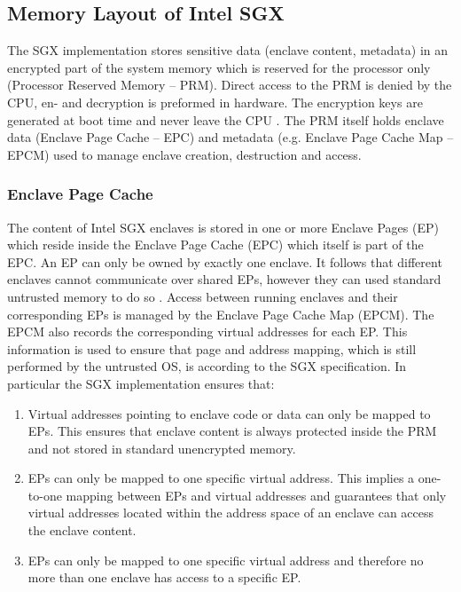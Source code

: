 \subsection{Memory Layout of Intel SGX}
The SGX implementation stores sensitive data (enclave content, metadata) in an encrypted part of the system memory which is reserved for the processor only (Processor
Reserved Memory -- PRM). Direct access to the PRM is denied by the CPU, en- and decryption is preformed in hardware. The encryption keys are generated at boot time and
never leave the CPU \cite{IntelSGXExplanation}. The PRM itself holds enclave data (Enclave Page Cache -- EPC) and metadata (e.g. Enclave Page Cache Map -- EPCM) used 
to manage enclave creation, destruction and access.

\subsubsection{Enclave Page Cache}
The content of Intel SGX enclaves is stored in one or more Enclave Pages (EP) which reside inside the Enclave Page Cache (EPC) which itself is part of the EPC. An EP
can only be owned by exactly one enclave. It follows that different enclaves cannot communicate over shared EPs, however they can used standard untrusted memory to
do so \cite{Costan2016IntelSE}. Access between running enclaves and their corresponding EPs is managed by the Enclave Page Cache Map (EPCM). The EPCM also records
the corresponding virtual addresses for each EP. This information is used to ensure that page and address mapping, which is still performed by the untrusted OS, 
is according to the SGX specification. In particular the SGX implementation ensures that:
\begin{enumerate}
    \item Virtual addresses pointing to enclave code or data can only be mapped to EPs. This ensures that enclave content is always protected inside the PRM and not stored in
          standard unencrypted memory.
    \item EPs can only be mapped to one specific virtual address. This implies a one-to-one mapping between EPs and virtual addresses and guarantees that only virtual addresses
          located within the address space of an enclave can access the enclave content.
    \item EPs can only be mapped to one specific virtual address and therefore no more than one enclave has access to a specific EP.
\end{enumerate}

